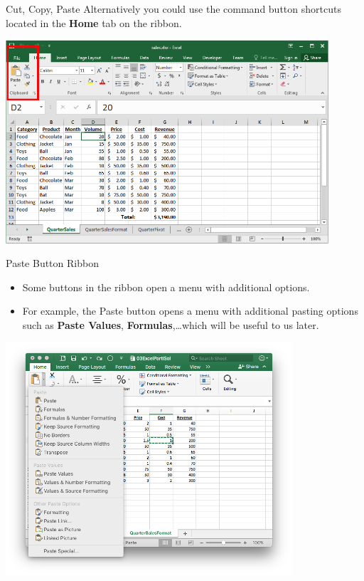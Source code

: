 \documentclass[xcolor=svgnames]{beamer}
\begin{document}
\begin{frame}{Cut, Copy, Paste}
Alternatively you could use the command button shortcuts located in the {\bf Home} tab on the ribbon.
\begin{center}
 \includegraphics[width=0.9\textwidth]{CutCopyPaste.png}
\end{center}                                         
\end{frame}

\begin{frame}{Paste Button Ribbon}
\begin{itemize}
\item Some buttons in the ribbon open a menu with additional options. 
\item For example, the Paste button  opens a menu with additional pasting options such as {\bf Paste Values}, {\bf Formulas},\dots  which will be useful to us later.
\end{itemize}
\begin{center}
 \includegraphics[width=0.8\textwidth]{pasteOpt}
\end{center}                                         

\end{frame}
\end{document}
